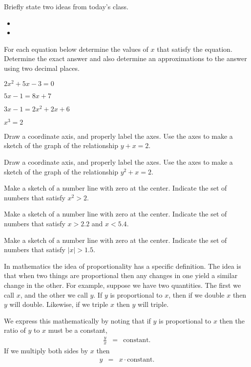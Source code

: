 \postClass

\begin{problem}
\item Briefly state two ideas from today's class.
  \begin{itemize}
  \item
  \item
  \end{itemize}
\item For each equation below determine the values of $x$ that satisfy
  the equation. Determine the exact answer and also determine an
  approximations to the answer using two decimal places.
  \begin{subproblem}
    \item $2x^2 + 5x - 3 = 0$
    \item $5x-1=8x+7$
    \item $3x - 1 = 2x^2 + 2x + 6$
    \item $x^3 = 2$
  \end{subproblem}
\item Draw a coordinate axis, and properly label the axes. Use the
  axes to make a sketch of the graph of the relationship $y+x=2$.
\item Draw a coordinate axis, and properly label the axes. Use the
  axes to make a sketch of the graph of the relationship $y^2+x=2$.
\item Make a sketch of a number line with zero at the center.
  Indicate the set of numbers that satisfy $x^2>2$.
\item Make a sketch of a number line with zero at the center.
  Indicate the set of numbers that satisfy $x>2.2$ and $x<5.4$.
\item Make a sketch of a number line with zero at the center.
  Indicate the set of numbers that satisfy $|x|>1.5$.

\item 
  In mathematics the idea of proportionality has a specific
  definition. The idea is that when two things are proportional then
  any changes in one yield a similar change in the other. For example,
  suppose we have two quantities. The first we call $x$, and the other
  we call $y$. If $y$ is proportional to $x$, then if we double $x$
  then $y$ will double. Likewise, if we triple $x$ then $y$ will
  triple.

  We express this mathematically by noting that if $y$ is proportional
  to $x$ then the ratio of $y$ to $x$ must be a constant,
  \begin{eqnarray*}
    \frac{y}{x} & = & \mathrm{constant}.
  \end{eqnarray*}
  If we multiply both sides by $x$ then
  \begin{eqnarray*}
    y & = & x \cdot \mathrm{constant}.
  \end{eqnarray*}


\end{problem}
